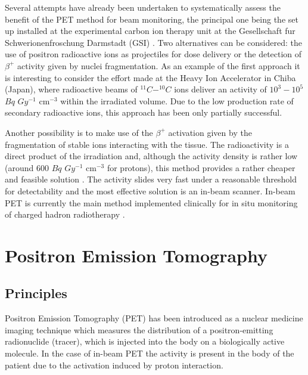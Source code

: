 Several attempts have already been undertaken to systematically assess the benefit of the PET method for beam monitoring, the principal one being the set up installed at the experimental carbon ion therapy unit at the Gesellschaft fur Schwerionenfroschung Darmstadt (GSI) \cite{Parodi2004}.
Two alternatives can be considered: the use of positron radioactive ions as projectiles for dose delivery or the detection of $\beta ^{+}$ activity given by nuclei fragmentation.
As an example of the first approach it is interesting to consider the effort made at the Heavy Ion Accelerator in Chiba (Japan), where radioactive beams of $^{11}C - ^{10}C$ ions deliver an activity of $10^{3} - 10^{5}$ $Bq$ $Gy^{-1}$ cm$^{-3}$ within the irradiated volume.
Due to the low production rate of secondary radioactive ions, this approach has been only partially successful.

Another possibility is to make use of the $\beta ^{+}$ activation given by the fragmentation of stable ions interacting with the tissue.
The radioactivity is a direct product of the irradiation and, although the activity density is rather low (around 600 $Bq$ $Gy^{-1}$ cm$^{-3}$ for protons), this method provides a rather cheaper and feasible solution \cite{Enghardt2004}.
The activity slides very fast under a reasonable threshold for detectability and the most effective solution is an in-beam scanner.
In-beam PET is currently the main method implemented clinically for in situ monitoring of charged hadron radiotherapy \cite{Crespo2007}.



\section{Positron Emission Tomography}
\subsection{Principles}
Positron Emission Tomography (PET) has been introduced as a nuclear medicine imaging technique which measures the distribution of a positron-emitting radionuclide (tracer), which is injected into the body on a biologically active molecule. In the case of in-beam PET the activity is present in the body of the patient due to the activation induced by proton interaction.

